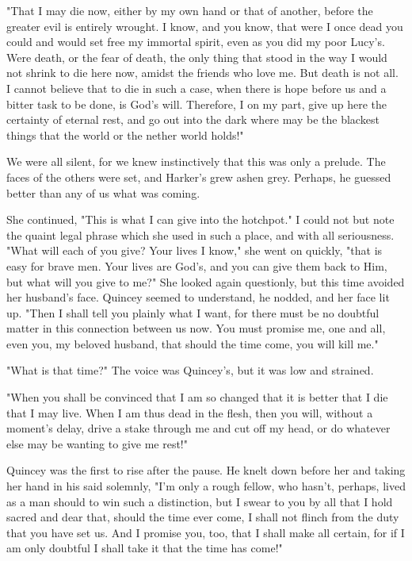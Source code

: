"That I may die now, either by my own hand or that of another, before the greater evil is entirely wrought. I know, and you know, that were I once dead you could and would set free my immortal spirit, even as you did my poor Lucy's. Were death, or the fear of death, the only thing that stood in the way I would not shrink to die here now, amidst the friends who love me. But death is not all. I cannot believe that to die in such a case, when there is hope before us and a bitter task to be done, is God's will. Therefore, I on my part, give up here the certainty of eternal rest, and go out into the dark where may be the blackest things that the world or the nether world holds!" 

We were all silent, for we knew instinctively that this was only a prelude. The faces of the others were set, and Harker's grew ashen grey. Perhaps, he guessed better than any of us what was coming. 

She continued, "This is what I can give into the hotchpot." I could not but note the quaint legal phrase which she used in such a place, and with all seriousness. "What will each of you give? Your lives I know," she went on quickly, "that is easy for brave men. Your lives are God's, and you can give them back to Him, but what will you give to me?" She looked again questionly, but this time avoided her husband's face. Quincey seemed to understand, he nodded, and her face lit up. "Then I shall tell you plainly what I want, for there must be no doubtful matter in this connection between us now. You must promise me, one and all, even you, my beloved husband, that should the time come, you will kill me." 

"What is that time?" The voice was Quincey's, but it was low and strained. 

"When you shall be convinced that I am so changed that it is better that I die that I may live. When I am thus dead in the flesh, then you will, without a moment's delay, drive a stake through me and cut off my head, or do whatever else may be wanting to give me rest!" 

Quincey was the first to rise after the pause. He knelt down before her and taking her hand in his said solemnly, "I'm only a rough fellow, who hasn't, perhaps, lived as a man should to win such a distinction, but I swear to you by all that I hold sacred and dear that, should the time ever come, I shall not flinch from the duty that you have set us. And I promise you, too, that I shall make all certain, for if I am only doubtful I shall take it that the time has come!" 

